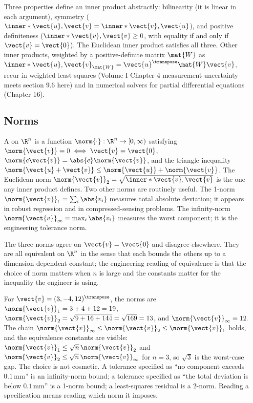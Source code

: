 Three properties define an inner product abstractly: bilinearity (it
is linear in each argument), symmetry ($\inner*{\vect{u}, \vect{v}}
= \inner*{\vect{v}, \vect{u}}$), and positive definiteness
($\inner*{\vect{v}, \vect{v}} \geq 0$, with equality if and only if
$\vect{v} = \vect{0}$). The Euclidean inner product satisfies all
three. Other inner products, weighted by a positive-definite matrix
$\mat{W}$ as $\inner*{\vect{u}, \vect{v}}_{\mat{W}} =
\vect{u}^{\transpose}\mat{W}\vect{v}$, recur in weighted
least-squares (Volume I Chapter 4 measurement uncertainty meets
section 9.6 here) and in numerical solvers for partial differential
equations (Chapter 16).

\subsection{Norms}

A  on $\R^{n}$ is a function $\norm{\cdot}: \R^{n} \to
[0, \infty)$ satisfying $\norm{\vect{v}} = 0 \iff \vect{v} =
\vect{0}$, $\norm{c\vect{v}} = \abs{c}\norm{\vect{v}}$, and the
triangle inequality $\norm{\vect{u} + \vect{v}} \leq \norm{\vect{u}}
+ \norm{\vect{v}}$. The Euclidean norm $\norm{\vect{v}}_{2} =
\sqrt{\inner*{\vect{v}, \vect{v}}}$ is the one any inner product
defines. Two other norms are routinely useful. The 1-norm
$\norm{\vect{v}}_{1} = \sum_{i} \abs{v_{i}}$ measures total
absolute deviation; it appears in robust regression and in
compressed-sensing problems. The infinity-norm $\norm{\vect{v}}_{\infty}
= \max_{i} \abs{v_{i}}$ measures the worst component; it is the
engineering tolerance norm.

The three norms agree on $\vect{v} = \vect{0}$ and disagree
elsewhere. They are all equivalent on $\R^{n}$ in the sense that
each bounds the others up to a dimension-dependent constant; the
engineering reading of equivalence is that the choice of norm
matters when $n$ is large and the constants matter for the
inequality the engineer is using.

\begin{example}
For $\vect{v} = (3, -4, 12)^{\transpose}$, the norms are
$\norm{\vect{v}}_{1} = 3 + 4 + 12 = 19$, $\norm{\vect{v}}_{2} =
\sqrt{9 + 16 + 144} = \sqrt{169} = 13$, and $\norm{\vect{v}}_{\infty}
= 12$. The chain $\norm{\vect{v}}_{\infty} \leq \norm{\vect{v}}_{2}
\leq \norm{\vect{v}}_{1}$ holds, and the equivalence constants are
visible: $\norm{\vect{v}}_{1} \leq \sqrt{n}\,\norm{\vect{v}}_{2}$ and
$\norm{\vect{v}}_{2} \leq \sqrt{n}\,\norm{\vect{v}}_{\infty}$ for
$n = 3$, so $\sqrt{3}$ is the worst-case gap. The choice is not
cosmetic. A tolerance specified as ``no component exceeds
$0.1\,\si{\milli\meter}$'' is an infinity-norm bound; a tolerance
specified as ``the total deviation is below $0.1\,\si{\milli\meter}$''
is a 1-norm bound; a least-squares residual is a 2-norm. Reading a
specification means reading which norm it imposes.
\end{example}

